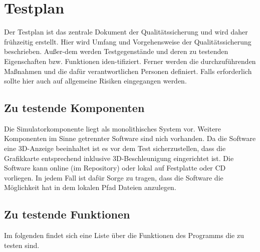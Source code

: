 
\chapter{Testplan}
Der Testplan ist das zentrale Dokument der Qualitätssicherung und wird daher
frühzeitig erstellt. Hier wird Umfang und Vorgehensweise der Qualitätssicherung
beschrieben. Außer-dem werden Testgegenstände und deren zu testenden
Eigenschaften bzw. Funktionen iden-tifiziert. Ferner werden die
durchzuführenden Maßnahmen und die dafür verantwortlichen Personen definiert.
Falls erforderlich sollte hier auch auf allgemeine Risiken eingegangen werden.

\section{Zu testende Komponenten}
Die Simulatorkomponente liegt als monolithisches System vor. Weitere Komponenten im Sinne getrennter Software sind nich vorhanden. 
Da die Software eine 3D-Anzeige beeinhaltet ist es vor dem Test sicherzustellen, dass die Grafikkarte entsprechend inklusive 3D-Beschleunigung eingerichtet ist.
Die Software kann online (im Repository) oder lokal auf Festplatte oder CD vorliegen. In jedem Fall ist dafür Sorge zu tragen, dass die Software die Möglichkeit hat
in dem lokalen Pfad Dateien anzulegen.

\section{Zu testende Funktionen}
% 
Im folgenden findet sich eine Liste über die Funktionen des Programms die zu testen sind. 

